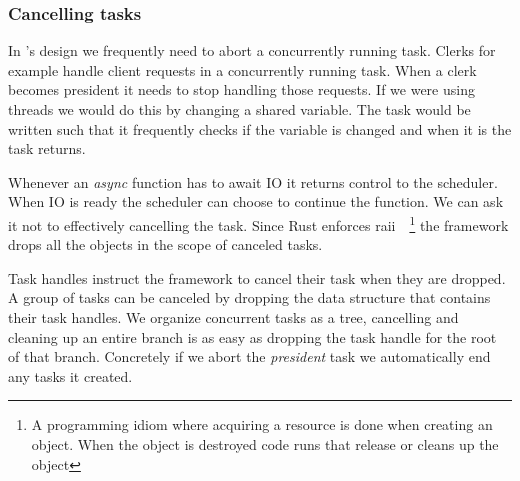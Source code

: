 \subsubsection*{Cancelling tasks}
In \name's design we frequently need to abort a concurrently running task. Clerks for example handle client requests in a concurrently running task. When a clerk becomes president it needs to stop handling those requests. If we were using threads we would do this by changing a shared variable. The task would be written such that it frequently checks if the variable is changed and when it is the task returns. 

Whenever an \textit{async} function has to await IO it returns control to the scheduler. When IO is ready the scheduler can choose to continue the function. We can ask it not to effectively cancelling the task. Since Rust enforces \acf{raii}~\cite[p.~389]{raii}~\footnote{A programming idiom where acquiring a resource is done when creating an object. When the object is destroyed code runs that release or cleans up the object} the framework drops all the objects in the scope of canceled tasks. 

Task handles instruct the framework to cancel their task when they are dropped. A group of tasks can be canceled by dropping the data structure that contains their task handles. We organize concurrent tasks as a tree, cancelling and cleaning up an entire branch is as easy as dropping the task handle for the root of that branch. Concretely if we abort the \textsl{president} task we automatically end any tasks it created.

